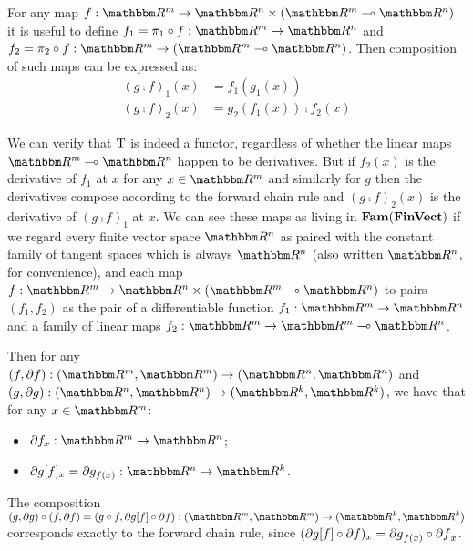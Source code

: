 For any map $f: \RR^m \to \RR^n \times (\RR^m \linearto \RR^n)$ it is useful to define $f_1 = \pi_1 \comp f:
\RR^m \to \RR^n$ and $f_2 = \pi_2 \comp f: \RR^m \to (\RR^m \linearto \RR^n)$. Then composition of such maps can be expressed as:
\begin{align*}
(g \comp f)_1(x) &= f_1(g_1(x)) \\
(g \comp f)_2(x) &= g_2(f_1(x)) \comp f_2(x)
\end{align*}

We can verify that $\mathrm{T}$ is indeed a functor, regardless of whether the linear maps $\RR^m \linearto
\RR^n$ happen to be derivatives. But if $f_2(x)$ is the derivative of $f_1$ at $x$ for any $x \in \RR^m$ and
similarly for $g$ then the derivatives compose according to the forward chain rule and $(g \comp f)_2(x)$ is
the derivative of $(g \comp f)_1$ at $x$. We can see these maps as living in $\mathbf{Fam}(\mathbf{FinVect})$ if we regard
every finite vector space $\RR^n$ as paired with the constant family of tangent spaces which is always $\RR^n$
(also written $\RR^n$, for convenience), and each map $f: \RR^m \to \RR^n \times (\RR^m \linearto \RR^n)$ to
pairs $(f_1, f_2)$ as the pair of a differentiable function $f_1: \RR^m \to \RR^n$ and a family of linear maps
$f_2: \RR^m \to \RR^m \linearto \RR^n$.

Then for any $(f, \partial f): (\RR^m, \RR^m) \to (\RR^n, \RR^n)$ and $(g, \partial g): (\RR^n, \RR^n) \to
(\RR^k, \RR^k)$, we have that for any $x \in \RR^m$:
\begin{itemize}
\item $\partial f_x: \RR^m \to \RR^n$;
\item $\reindex{\partial g}{f}_x = \partial g_{f(x)}: \RR^n \to \RR^k$.
\end{itemize}

\noindent The composition $(g, \partial g) \comp (f, \partial f) = (g \comp f, \reindex{\partial g}{f} \comp
\partial f): (\RR^m, \RR^m) \to (\RR^k, \RR^k)$ corresponds exactly to the forward chain rule,
since $(\partial g[f] \circ \partial f)_x = {\partial g}_{f(x)} \circ {\partial f}_x$.

